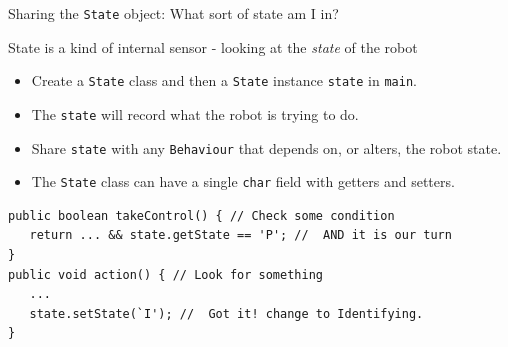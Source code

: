 \documentclass[color=pdftex,usenames,dvipsnames, aspectratio=169]{beamer}
\begin{document}
\begin{frame}[fragile]{Sharing the \lstinline!State! object: What sort of state am I in?}
\begin{block}{State is a kind of internal sensor - looking at the \emph{state} of the robot}
\begin{itemize}
\item Create a \lstinline!State! class and then a \lstinline!State! instance \lstinline!state! in \lstinline!main!.
\item The \lstinline!state! will record what the robot is trying to do.
\item Share \lstinline!state! with any \lstinline!Behaviour! that depends on, or alters, the robot state.
\item The \lstinline!State! class can have a single \lstinline!char! field with getters and setters.
\end{itemize}
\end{block}
\begin{lstlisting}
public boolean takeControl() { // Check some condition
   return ... && state.getState == 'P'; //  AND it is our turn
}
public void action() { // Look for something
   ...
   state.setState(`I'); //  Got it! change to Identifying.
}
\end{lstlisting}
\end{frame}
\end{document}
